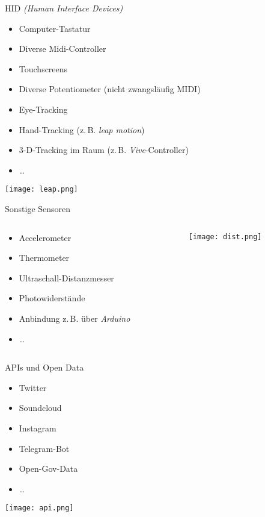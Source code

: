 \begin{frame}{HID \emph{(Human Interface Devices)}}
	\begin{itemize}
		\item Computer-Tastatur
		\item Diverse Midi-Controller
		\item Touchscreens
		\item Diverse Potentiometer (nicht zwangsläufig MIDI)
		\item Eye-Tracking
		\item Hand-Tracking (z.\,B. \emph{leap motion})
		\item 3-D-Tracking im Raum (z.\,B. \emph{Vive}-Controller)
		\item \dots{}
	\end{itemize}
\begin{center}
\texttt{[image: leap.png]}
\end{center}

\end{frame}


\begin{frame}{Sonstige Sensoren}

\begin{columns}
	\begin{column}{0.5\textwidth}
		\begin{itemize}
		\item Accelerometer
		\item Thermometer
		\item Ultraschall-Distanzmesser
		\item Photowiderstände
		\item Anbindung z.\,B. über \emph{Arduino}
		\item \dots{}
		\end{itemize}
	\end{column}

	\begin{column}{0.5\textwidth}
		\texttt{[image: dist.png]}
	\end{column}

\end{columns}

\end{frame}


\begin{frame}{APIs und Open Data}
\begin{itemize}
	\item Twitter
	\item Soundcloud
	\item Instagram
	\item Telegram-Bot
	\item Open-Gov-Data
	\item \dots{}

\end{itemize}
\begin{center}
\texttt{[image: api.png]}
\end{center}

\end{frame}


